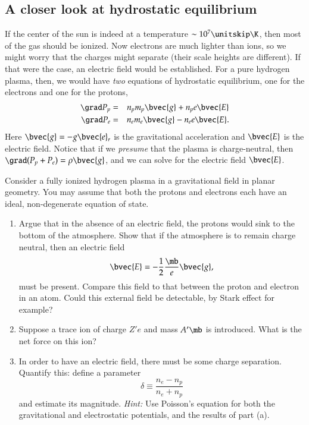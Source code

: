 \subsection{A closer look at hydrostatic equilibrium}
If the center of the sun is indeed at a temperature $\sim 10^{7}\nsp\K$, then most of the gas should be ionized. Now electrons are much lighter than ions, so we might worry that the charges might separate (their scale heights are different).  If that were the case, an electric field would be established.   For a pure hydrogen plasma, then, we would have \emph{two} equations of hydrostatic equilibrium, one for the electrons and one for the protons,
\begin{eqnarray}
\grad P_{p} &=& n_{p}m_{p} \bvec{g}  +  n_{p}e\bvec{E} \\
\grad P_{e} &=& n_{e}m_{e}\bvec{g} - n_{e} e \bvec{E}.
\end{eqnarray}
Here $\bvec{g} = -g \bvec{e}_{r}$ is the gravitational acceleration and $\bvec{E}$ is the electric field. Notice that if we \emph{presume} that the plasma is charge-neutral, then $\grad (P_{p}+P_{e}) = \rho \bvec{g}$, and we can solve for the electric field $\bvec{E}$. 

\begin{exercisebox}
Consider a fully ionized hydrogen plasma in a gravitational field in planar geometry.  You may assume that both the protons and electrons each have an ideal, non-degenerate equation of state.
\begin{enumerate}
\item Argue that in the absence of an electric field, the protons would sink to the bottom of the atmosphere. Show that if the atmosphere is to remain charge neutral, then an electric field
\[
	\bvec{E} = -\frac{1}{2}\frac{\mb}{e}\bvec{g},
\]
must be present. Compare this field to that between the proton and electron in an atom.  Could this external field be detectable, by Stark effect for example?

\item Suppose a trace ion of charge $Z'e$ and mass $A'\mb$ is	 introduced.  What is the net force on this ion?

\item In order to have an electric field, there must be some charge separation.  Quantify this: define a parameter
\[ \delta \equiv \frac{n_{e}-n_{p}}{n_{e} + n_{p}} \]
and estimate its magnitude.  \emph{Hint:} Use Poisson's equation for both the gravitational and electrostatic potentials, and the results of part (a).
\end{enumerate}
\end{exercisebox}

